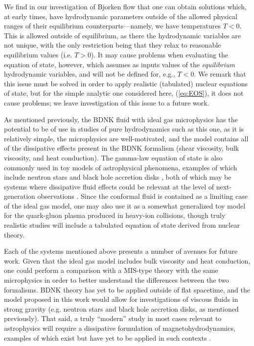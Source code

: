 \documentclass[%
notitlepage,
superscriptaddress,
nofootinbib,
amsmath,
amssymb,
aps,
twocolumn
]{revtex4-1}
\begin{document}
We find in our investigation of Bjorken flow that one can obtain solutions which, at early times, have hydrodynamic parameters outside of the allowed physical ranges of their equilibrium counterparts---namely, we have temperatures $T < 0$.  This is allowed outside of equilibrium, as there the hydrodynamic variables are not unique, with the only restriction being that they relax to reasonable equilibrium values (i.e. $T > 0$).  It may cause problems when evaluating the equation of state, however, which assumes as inputs values of the \textit{equilibrium} hydrodynamic variables, and will not be defined for, e.g., $T < 0$.  We remark that this issue must be solved in order to apply realistic (tabulated) nuclear equations of state, but for the simple analytic one considered here, (\ref{eq:EOS}), it does not cause problems; we leave investigation of this issue to a future work.

As mentioned previously, the BDNK fluid with ideal gas microphysics has the potential to be of use in studies of pure hydrodynamics such as this one, as it is relatively simple, the microphysics are well-motivated, and the model contains all of the dissipative effects present in the BDNK formalism (shear viscosity, bulk viscosity, and heat conduction).  The gamma-law equation of state is also commonly used in toy models of astrophysical phenomena, examples of which include neutron stars \cite{Noble2015,Mosta2013} and black hole accretion disks \cite{Gammie2003,Stone2008}, both of which may be systems where dissipative fluid effects could be relevant at the level of next-generation observations \cite{Most2021bulk,Most:2022yhe,Chandra2017,EventHorizonTelescope:2022urf}.  Since the conformal fluid is contained as a limiting case of the ideal gas model, one may also use it as a somewhat generalized toy model for the quark-gluon plasma produced in heavy-ion collisions, though truly realistic studies will include a tabulated equation of state derived from nuclear theory.

Each of the systems mentioned above presents a number of avenues for future work.  Given that the ideal gas model includes bulk viscosity and heat conduction, one could perform a comparison with a MIS-type theory with the same microphysics in order to better understand the differences between the two formalisms.  BDNK theory has yet to be applied outside of flat spacetime, and the model proposed in this work would allow for investigations of viscous fluids in strong gravity (e.g. neutron stars and black hole accretion disks, as mentioned previously). That said, a truly ``modern'' study in most cases relevant to astrophysics will require a dissipative formulation of magnetohydrodynamics, examples of which exist but have yet to be applied in such contexts \cite{Armas:2022wvb,Most:2021uck,Most:2021rhr}.
\end{document}
